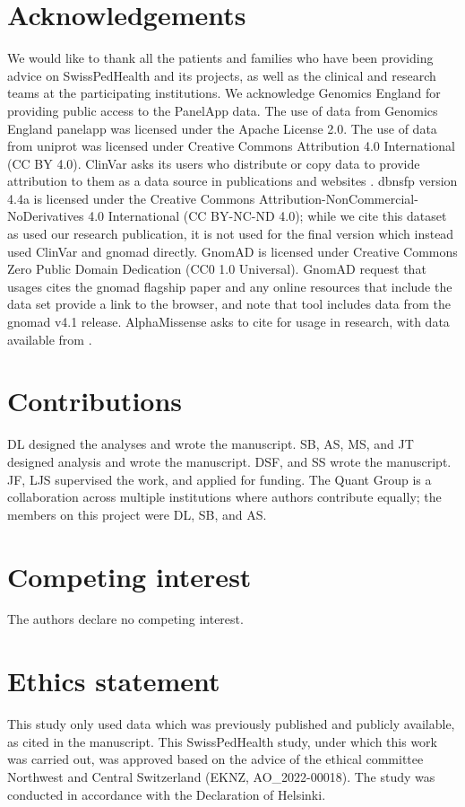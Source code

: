 \section*{Acknowledgements}
\noindent
We would like to thank all the patients and families who have been providing advice on SwissPedHealth and its projects, as well as the clinical and research teams at the participating institutions.
We acknowledge Genomics England for providing public access to the PanelApp data.
The use of data from Genomics England panelapp was licensed under the Apache License 2.0.
The use of data from \ac{uniprot} was licensed under Creative Commons Attribution 4.0 International (CC BY 4.0).
ClinVar asks its users who distribute or copy data to provide attribution to them as a data source in publications and websites \cite{landrum_clinvar_2018}.
\ac{dbnsfp} version 4.4a is licensed under the Creative Commons Attribution-NonCommercial-NoDerivatives 4.0 International (CC BY-NC-ND 4.0); while we cite this dataset as used our research publication, it is not used for the final version which instead used ClinVar and \ac{gnomad} directly.
GnomAD is licensed under  Creative Commons  Zero Public Domain Dedication (CC0 1.0 Universal).
GnomAD request that usages cites the \ac{gnomad} flagship paper \cite{karczewski2020mutational}
and any online resources that include the data set provide a link to the browser, and note that tool includes data from the \ac{gnomad} v4.1 release.
AlphaMissense asks to cite \citet{cheng_accurate_2023} for usage in research, with data available from \citet{jun_cheng_2023_8208688}.

\section*{Contributions}
\noindent 
DL designed the analyses and wrote the manuscript.
SB, AS, MS, and JT designed analysis and wrote the manuscript.
DSF, and SS wrote the manuscript.
JF, LJS supervised the work, and applied for funding.
The Quant Group is a collaboration across multiple institutions where authors contribute equally; the members on this project were DL, SB, and AS.

\section*{Competing interest}
\noindent
The authors declare no competing interest. 

\section*{Ethics statement}
\noindent
This study only used data which was previously published and publicly available, as cited in the manuscript.
This  SwissPedHealth study, under which this work was carried out, was approved based on the advice of the ethical committee Northwest and Central Switzerland (EKNZ, AO\_2022-00018). 
The study was conducted in accordance with the Declaration of Helsinki.

